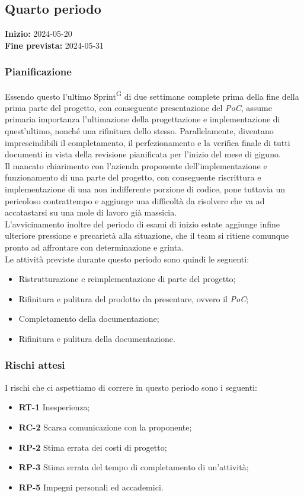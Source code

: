 \documentclass[8pt]{article}
\newcommand{\glossterm}[1]{#1\textsuperscript{G}} %
\begin{document}
\subsection{Quarto periodo} \label{sec:4_rtb}
\textbf{Inizio:} 2024-05-20\\
\textbf{Fine prevista:} 2024-05-31
\subsubsection{Pianificazione}
Essendo questo l'ultimo \glossterm{Sprint} di due settimane complete prima della fine della prima parte del progetto,
con conseguente presentazione del \textit{PoC}, assume primaria importanza l'ultimazione della progettazione
e implementazione di quest'ultimo, nonché una rifinitura dello stesso. Parallelamente, diventano imprescindibili
il completamento, il perfezionamento e la verifica finale di tutti documenti in vista della revisione pianificata
per l'inizio del mese di giguno. \\
Il mancato chiarimento con l'azienda proponente dell'implementazione e funzionamento di una parte del progetto,
con conseguente riscrittura e implementazione di una non indifferente porzione di codice, pone tuttavia un pericoloso
contrattempo e aggiunge una difficoltà da risolvere che va ad accatastarsi su una mole di lavoro già massicia. \\
L'avvicinamento inoltre del periodo di esami di inizio estate aggiunge infine ulteriore pressione e precarietà
alla situazione, che il team si ritiene comunque pronto ad affrontare con determinazione e grinta.\\
Le attività previste durante questo periodo sono quindi le seguenti:
\begin{itemize}
\setlength{\itemsep}{0em}
    \item Ristrutturazione e reimplementazione di parte del progetto;
    \item Rifinitura e pulitura del prodotto da presentare, ovvero il \textit{PoC};
    \item Completamento della documentazione;
    \item Rifinitura e pulitura della documentazione.
\end{itemize}
\subsubsection{Rischi attesi}
I rischi che ci aspettiamo di correre in questo periodo sono i seguenti: 
\begin{itemize}
\setlength{\itemsep}{0em}
    \item \textbf{RT-1} Inesperienza;  
    \item \textbf{RC-2} Scarsa comunicazione con la proponente;
    \item \textbf{RP-2} Stima errata dei costi di progetto;
    \item \textbf{RP-3} Stima errata del tempo di completamento di un'attività;
    \item \textbf{RP-5} Impegni personali ed accademici.
\end{itemize}
\clearpage
\end{document}
